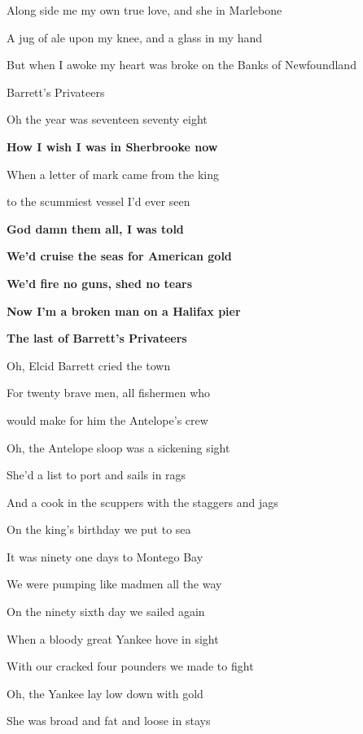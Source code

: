\documentclass[letterpaper,9pt]{article}
\begin{document}
Along side me my own true love, and she in Marlebone

A jug of ale upon my knee, and a glass in my hand

But when I awoke my heart was broke on the Banks of Newfoundland

\newpage
{}
\huge
Barrett's Privateers

\hfill

\large
Oh the year was seventeen seventy eight

\textbf{How I wish I was in Sherbrooke now}

When a letter of mark came from the king

to the scummiest vessel I'd ever seen 

\textbf {God damn them all, I was told}

\textbf {We'd cruise the seas for American gold}

\textbf {We'd fire no guns, shed no tears}

\textbf {Now I'm a broken man on a Halifax pier}

\textbf {The last of Barrett's Privateers}

\hfill

\large
Oh, Elcid Barrett cried the town

For twenty brave men, all fishermen who

would make for him the Antelope's crew

\hfill

Oh, the Antelope sloop was a sickening sight

She'd a list to port and sails in rags

And a cook in the scuppers with the staggers and jags

\hfill

On the king's birthday we put to sea

It was ninety one days to Montego Bay

We were pumping like madmen all the way

\hfill

On the ninety sixth day we sailed again

When a bloody great Yankee hove in sight

With our cracked four pounders we made to fight

\hfill

Oh, the Yankee lay low down with gold

She was broad and fat and loose in stays
\end{document}

